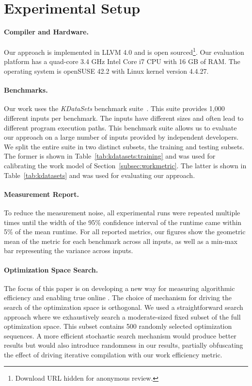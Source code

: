 \section{Experimental Setup}\label{sec:setup}

\paragraph{Compiler and Hardware.}
Our approach is implemented in LLVM 4.0 and is open sourced\footnote{Download URL hidden for anonymous review.}. Our evaluation platform has
a quad-core 3.4 GHz Intel Core i7 CPU with 16 GB of RAM. The operating system is openSUSE 42.2 with Linux kernel version 4.4.27.

\paragraph{Benchmarks.}
Our work uses the \textit{KDataSets} benchmark suite~\cite{chen10,chen12a}. This suite provides 1,000 different inputs per benchmark. The
inputs have different sizes and often lead to different program execution paths. This benchmark suite allows us to evaluate our approach on
a large number of inputs provided by independent developers. We split the entire suite in two distinct subsets, the training and testing
subsets. The former is shown in Table~\ref{tab:kdatasets:training} and was used for calibrating the work model of
Section~\ref{subsec:workmetric}. The latter is shown in Table~\ref{tab:kdatasets} and was used for evaluating our approach.



\paragraph{Measurement Report.}
To reduce the measurement noise, all experimental runs were repeated multiple times until the width of the 95\% confidence interval of the
runtime came within 5\% of the mean runtime. For all reported metrics, our figures show the geometric mean of the metric for each benchmark
across all inputs, as well as a min-max bar representing the variance across inputs.

\paragraph{Optimization Space Search.}

The focus of this paper is on developing a new way for measuring algorithmic efficiency and enabling true online {\itercomp}. The choice of
mechanism for driving the search of the optimization space is orthogonal. We used a straightforward search approach where we exhaustively
search a moderate-sized fixed subset of the full optimization space. This subset contains 500 randomly selected optimization sequences. A
more efficient stochastic search mechanism would produce better results but would also introduce randomness in our results, partially
obfuscating the effect of driving iterative compilation with our work efficiency metric.



